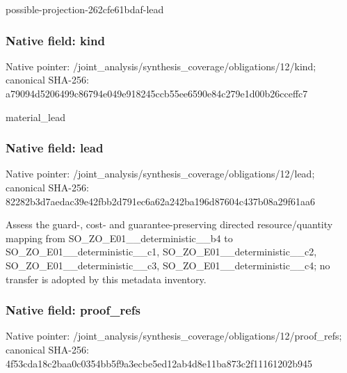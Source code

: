\documentclass[10pt,a4paper]{article}
\begin{document}
\begingroup\raggedright\sloppy possible-projection-262cfe61bdaf-lead\par\endgroup

\subsubsection{Native field: kind}
Native pointer: /joint\_\allowbreak{}analysis/synthesis\_\allowbreak{}coverage/obligations/12/kind; canonical SHA-256: a79094d5206499c86794e049e918245ccb55ee6590e84c279e1d00b26cceffc7

\begingroup\raggedright\sloppy material\_\allowbreak{}lead\par\endgroup

\subsubsection{Native field: lead}
Native pointer: /joint\_\allowbreak{}analysis/synthesis\_\allowbreak{}coverage/obligations/12/lead; canonical SHA-256: 82282b3d7aedac39e42fbb2d791ec6a62a242ba196d87604c437b08a29f61aa6

\begingroup\raggedright\sloppy Assess the guard-,\allowbreak{} cost- and guarantee-preserving directed resource/\allowbreak{}quantity mapping from SO\_\allowbreak{}ZO\_\allowbreak{}E01\_\allowbreak{}\_\allowbreak{}deterministic\_\allowbreak{}\_\allowbreak{}b4 to SO\_\allowbreak{}ZO\_\allowbreak{}E01\_\allowbreak{}\_\allowbreak{}deterministic\_\allowbreak{}\_\allowbreak{}c1,\allowbreak{} SO\_\allowbreak{}ZO\_\allowbreak{}E01\_\allowbreak{}\_\allowbreak{}deterministic\_\allowbreak{}\_\allowbreak{}c2,\allowbreak{} SO\_\allowbreak{}ZO\_\allowbreak{}E01\_\allowbreak{}\_\allowbreak{}deterministic\_\allowbreak{}\_\allowbreak{}c3,\allowbreak{} SO\_\allowbreak{}ZO\_\allowbreak{}E01\_\allowbreak{}\_\allowbreak{}deterministic\_\allowbreak{}\_\allowbreak{}c4;\allowbreak{} no transfer is adopted by this metadata inventory.\par\endgroup

\subsubsection{Native field: proof\_\allowbreak{}refs}
Native pointer: /joint\_\allowbreak{}analysis/synthesis\_\allowbreak{}coverage/obligations/12/proof\_\allowbreak{}refs; canonical SHA-256: 4f53cda18c2baa0c0354bb5f9a3ecbe5ed12ab4d8e11ba873c2f11161202b945
\end{document}
